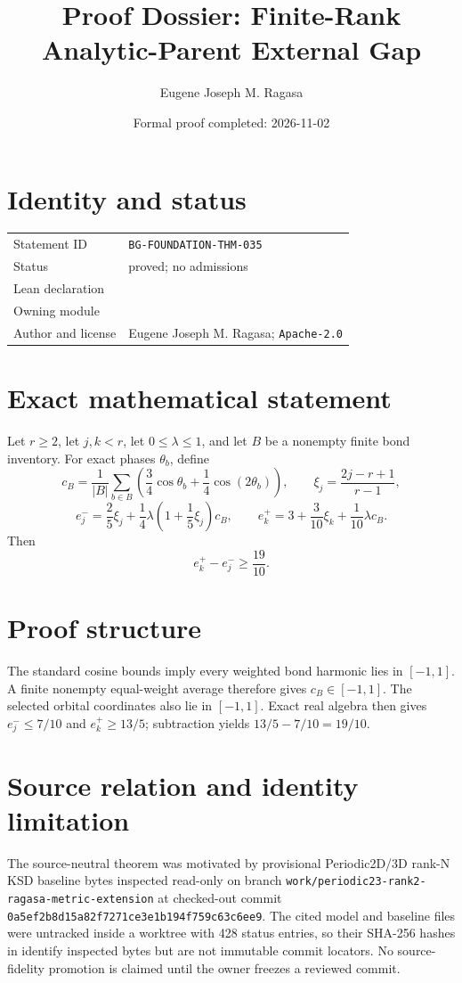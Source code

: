 \documentclass[10pt]{article}
\title{Proof Dossier: Finite-Rank Analytic-Parent External Gap}
\author{Eugene Joseph M. Ragasa}
\date{Formal proof completed: 2026-11-02}
\begin{document}
\raggedright
\maketitle

\section{Identity and status}
\begin{tabularx}{\textwidth}{@{}lY@{}}
\toprule
Statement ID & \texttt{BG-FOUNDATION-THM-035} \\
Status & proved; no admissions \\
Lean declaration &  \\
Owning module &  \\
Author and license & Eugene Joseph M. Ragasa; \texttt{Apache-2.0} \\
\bottomrule
\end{tabularx}

\section{Exact mathematical statement}
Let $r\ge2$, let $j,k<r$, let $0\le\lambda\le1$, and let $B$ be a nonempty finite bond inventory.
For exact phases $\theta_b$, define
\[
 c_B=\frac1{|B|}\sum_{b\in B}\left(\frac34\cos\theta_b+
 \frac14\cos(2\theta_b)\right),\qquad
 \xi_j=\frac{2j-r+1}{r-1},
\]
\[
 e^-_j=\frac25\xi_j+\frac14\lambda\left(1+\frac15\xi_j\right)c_B,
 \qquad e^+_k=3+\frac3{10}\xi_k+\frac1{10}\lambda c_B.
\]
Then
\[
 e^+_k-e^-_j\ge\frac{19}{10}.
\]

\section{Proof structure}
The standard cosine bounds imply every weighted bond harmonic lies in $[-1,1]$. A finite nonempty
equal-weight average therefore gives $c_B\in[-1,1]$. The selected orbital coordinates also lie in
$[-1,1]$. Exact real algebra then gives $e^-_j\le7/10$ and $e^+_k\ge13/5$; subtraction yields
$13/5-7/10=19/10$.

\section{Source relation and identity limitation}
The source-neutral theorem was motivated by provisional Periodic2D/3D rank-N KSD baseline bytes
inspected read-only on branch \texttt{work/periodic23-rank2-ragasa-metric-extension} at checked-out
commit \texttt{0a5ef2b8d15a82f7271ce3e1b194f759c63c6ee9}. The cited model and baseline files were untracked
inside a worktree with 428 status entries, so their SHA-256 hashes in 
identify inspected bytes but are not immutable commit locators. No source-fidelity promotion is
claimed until the owner freezes a reviewed commit.
\end{document}
